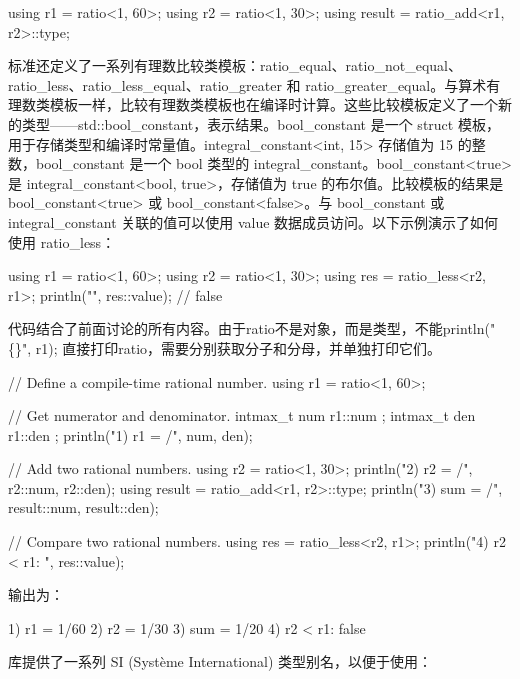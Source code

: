 \begin{cpp}
using r1 = ratio<1, 60>;
using r2 = ratio<1, 30>;
using result = ratio_add<r1, r2>::type;
\end{cpp}

标准还定义了一系列有理数比较类模板：ratio\_equal、ratio\_not\_equal、ratio\_less、ratio\_less\_equal、ratio\_greater 和 ratio\_greater\_equal。与算术有理数类模板一样，比较有理数类模板也在编译时计算。这些比较模板定义了一个新的类型——std::bool\_constant，表示结果。bool\_constant 是一个 struct 模板，用于存储类型和编译时常量值。integral\_constant<int, 15> 存储值为 15 的整数，bool\_constant 是一个 bool 类型的 integral\_constant。bool\_constant<true> 是 integral\_constant<bool, true>，存储值为 true 的布尔值。比较模板的结果是 bool\_constant<true> 或 bool\_constant<false>。与 bool\_constant 或 integral\_constant 关联的值可以使用 value 数据成员访问。以下示例演示了如何使用 ratio\_less：

\begin{cpp}
using r1 = ratio<1, 60>;
using r2 = ratio<1, 30>;
using res = ratio_less<r2, r1>;
println("{}", res::value); // false
\end{cpp}

代码结合了前面讨论的所有内容。由于ratio不是对象，而是类型，不能println("\{\}", r1); 直接打印ratio，需要分别获取分子和分母，并单独打印它们。

\begin{cpp}
// Define a compile-time rational number.
using r1 = ratio<1, 60>;

// Get numerator and denominator.
intmax_t num { r1::num };
intmax_t den { r1::den };
println("1) r1 = {}/{}", num, den);

// Add two rational numbers.
using r2 = ratio<1, 30>;
println("2) r2 = {}/{}", r2::num, r2::den);
using result = ratio_add<r1, r2>::type;
println("3) sum = {}/{}", result::num, result::den);

// Compare two rational numbers.
using res = ratio_less<r2, r1>;
println("4) r2 < r1: {}", res::value);
\end{cpp}

输出为：

\begin{shell}
1) r1 = 1/60
2) r2 = 1/30
3) sum = 1/20
4) r2 < r1: false
\end{shell}

库提供了一系列 SI (Système International) 类型别名，以便于使用：

